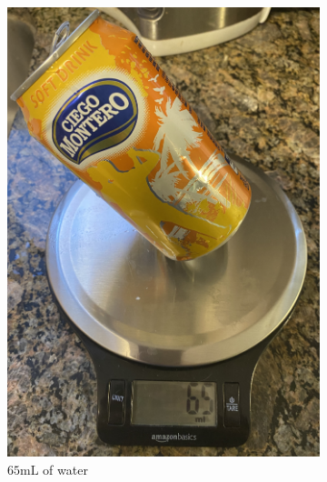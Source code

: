 \documentclass[11pt]{article}
\begin{document}
    \begin{figure}[H]
        \centering
        \begin{subfigure}{.3\textwidth}
            \centering
            \includegraphics[width=.88\linewidth]{images/scale_65.JPG}
            \vspace{-8pt}
            \caption{$65 \mathrm{mL}$ of water}
            \label{fig:scale-65}
        \end{subfigure}
        \begin{subfigure}{.3\textwidth}
            \centering

\end{subfigure}
\end{figure}
\end{document}
